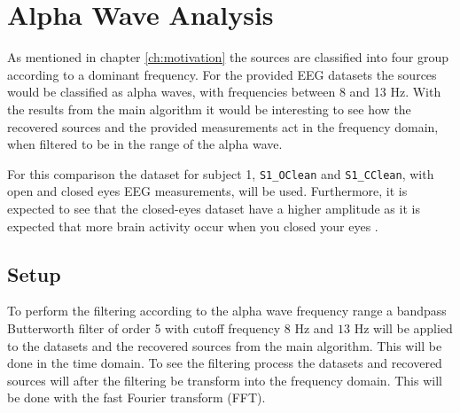 \section{Alpha Wave Analysis}
As mentioned in chapter \ref{ch:motivation} the sources are classified into four group according to a dominant frequency.
For the provided EEG datasets the sources would be classified as alpha waves, with frequencies between 8 and 13 Hz.
With the results from the main algorithm it would be interesting to see how the recovered sources and the provided measurements act in the frequency domain, when filtered to be in the range of the alpha wave.

For this comparison the dataset for subject 1, \texttt{S1\_OClean} and \texttt{S1\_CClean}, with open and closed eyes EEG measurements, will be used. 
Furthermore, it is expected to see that the closed-eyes dataset have a higher amplitude as it is expected that more brain activity occur when you closed your eyes .

\subsection{Setup}
To perform the filtering according to the alpha wave frequency range a bandpass Butterworth filter of order 5 with cutoff frequency $8$ Hz and $13$ Hz will be applied to the datasets and the recovered sources from the main algorithm. This will be done in the time domain. 
To see the filtering process the datasets and recovered sources will after the filtering be transform into the frequency domain. This will be done with the fast Fourier transform (FFT).

